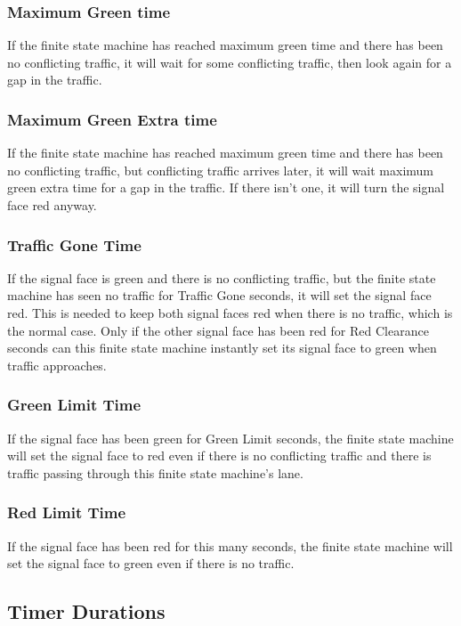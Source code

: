 \documentclass[letterpaper,twoside]{article}
\begin{document}
\subsubsection{Maximum Green time}
If the finite state machine has reached maximum green time and there has
been no conflicting traffic, it will wait for some conflicting traffic,
then look again for a gap in the traffic.

\subsubsection{Maximum Green Extra time}
If the finite state machine has reached maximum green time and there has
been no conflicting traffic, but conflicting traffic arrives later,
it will wait maximum green extra time for a gap in the traffic.
If there isn't one, it will turn the signal face red anyway.

\subsubsection{Traffic Gone Time}
If the signal face is green and there is no conflicting traffic,
but the finite state machine has seen no traffic for Traffic Gone seconds,
it will set the signal face red.
This is needed to keep both signal faces
red when there is no traffic, which is the normal case.  Only if the other
signal face has been red for Red Clearance seconds can this finite state
machine instantly set its signal face to green when traffic approaches.

\subsubsection{Green Limit Time}

If the signal face has been green for Green Limit seconds, the finite state
machine will set the signal face to red even if there is no conflicting
traffic and there is traffic passing through this finite state machine's lane.

\subsubsection{Red Limit Time}
If the signal face has been red for this many seconds, the finite state
machine will set the signal face to green even if there is no traffic.

\subsection{Timer Durations}
\end{document}
